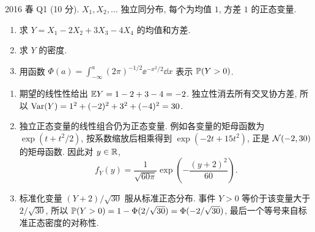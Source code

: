 \begin{exercise}\label{ex:fe2016q1}
2016 春 Q1 (10 分). $X_1,X_2,\ldots$ 独立同分布, 每个为均值 $1$, 方差 $1$ 的正态变量.
\begin{enumerate}[label=(\alph*)]
\item\label{ex:fe2016q1-a} 求 $Y=X_1-2X_2+3X_3-4X_4$ 的均值和方差.
\item\label{ex:fe2016q1-b} 求 $Y$ 的密度.
\item\label{ex:fe2016q1-c} 用函数 $\Phi(a)=\int_{-\infty}^a(2\pi)^{-1/2}\ee^{-x^2/2}\dd x$ 表示 $\mathbb P(Y>0)$.
\end{enumerate}
\end{exercise}
\begin{solution}
\begin{enumerate}[label=(\alph*)]
\item\label{sol:fe2016q1-a} 期望的线性性给出 $\mathbb E Y=1-2+3-4=-2$. 独立性消去所有交叉协方差, 所以 $\operatorname{Var}(Y)=1^2+(-2)^2+3^2+(-4)^2=30$.
\item\label{sol:fe2016q1-b} 独立正态变量的线性组合仍为正态变量. 例如各变量的矩母函数为 $\exp(t+t^2/2)$, 按系数缩放后相乘得到 $\exp(-2t+15t^2)$, 正是 $\mathcal N(-2,30)$ 的矩母函数. 因此对 $y\in\mathbb R$,
\[
 f_Y(y)=\frac1{\sqrt{60\pi}}\exp\left(-\frac{(y+2)^2}{60}\right).
\]
\item\label{sol:fe2016q1-c} 标准化变量 $(Y+2)/\sqrt{30}$ 服从标准正态分布. 事件 $Y>0$ 等价于该变量大于 $2/\sqrt{30}$, 所以
$\mathbb P(Y>0)=1-\Phi(2/\sqrt{30})=\Phi(-2/\sqrt{30})$, 最后一个等号来自标准正态密度的对称性.
\end{enumerate}
\end{solution}

